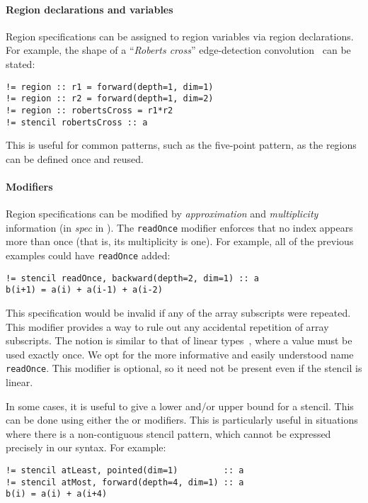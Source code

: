\documentclass[acmlarge,review,anonymous]{acmart}\settopmatter{printfolios=true}
\theoremstyle{definition}
\theoremstyle{plain}
\theoremstyle{remark}
\begin{document}
\paragraph{Region declarations and variables}

Region specifications can be assigned to region variables via
region declarations. For example, the shape of a
``\emph{Roberts cross}'' edge-detection convolution~\cite{davis1975survey}
can be stated:
\begin{verbatim}
!= region :: r1 = forward(depth=1, dim=1)
!= region :: r2 = forward(depth=1, dim=2)
!= region :: robertsCross = r1*r2
!= stencil robertsCross :: a
\end{verbatim}
This is useful for common patterns, such as the five-point
pattern, as the regions can be defined once and reused.
\paragraph{Modifiers}
Region specifications can be modified
by \emph{approximation} and \emph{multiplicity} information
(in \textit{spec} in ).
The \texttt{readOnce} modifier enforces that no index appears more
than once (that is, its multiplicity is one). For example, all of
the previous examples could have \texttt{readOnce} added:
%
\begin{verbatim}
!= stencil readOnce, backward(depth=2, dim=1) :: a
b(i+1) = a(i) + a(i-1) + a(i-2)
\end{verbatim}
%
This specification would be invalid if any of the
array subscripts were repeated. This modifier provides a way to
rule out any accidental repetition of array subscripts.
The notion is similar to that of linear types~\cite{wadler1990linear}, where a value must be used
exactly once. We opt for the more informative and easily understood name
\texttt{readOnce}. This modifier is optional, so it need not
be present even if the stencil is linear.

In some cases, it is useful to give a lower and/or upper bound for a
stencil. This can be done using either the  or
 modifiers. This is particularly useful in situations
where there is a non-contiguous stencil pattern, which cannot be expressed
precisely in our syntax. For example:
%
\begin{verbatim}
!= stencil atLeast, pointed(dim=1)         :: a
!= stencil atMost, forward(depth=4, dim=1) :: a
b(i) = a(i) + a(i+4)
\end{verbatim}
\end{document}
